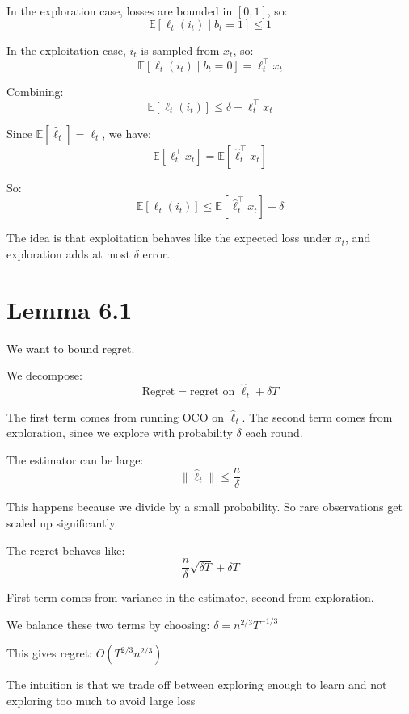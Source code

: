 \documentclass{article}
\begin{document}
In the exploration case, losses are bounded in $[0,1]$, so:
\[
\mathbb{E}[\ell_t(i_t)\mid b_t=1] \le 1
\]

In the exploitation case, $i_t$ is sampled from $x_t$, so:
\[
\mathbb{E}[\ell_t(i_t)\mid b_t=0] = \ell_t^\top x_t
\]

Combining:
\[
\mathbb{E}[\ell_t(i_t)] \le \delta + \ell_t^\top x_t
\]

Since $\mathbb{E}[\hat{\ell}_t] = \ell_t$, we have:
\[
\mathbb{E}[\ell_t^\top x_t] = \mathbb{E}[\hat{\ell}_t^\top x_t]
\]

So:
\[
\mathbb{E}[\ell_t(i_t)] \le \mathbb{E}[\hat{\ell}_t^\top x_t] + \delta
\]

The idea is that exploitation behaves like the expected loss under $x_t$, and exploration adds at most $\delta$ error.

\section{Lemma 6.1}

We want to bound regret.

We decompose:
\[
\text{Regret} = \text{regret on } \hat{\ell}_t + \delta T
\]

The first term comes from running OCO on $\hat{\ell}_t$. The second term comes from exploration, since we explore with probability $\delta$ each round.

The estimator can be large:
\[
\|\hat{\ell}_t\| \le \frac{n}{\delta}
\]

This happens because we divide by a small probability. So rare observations get scaled up significantly.

The regret behaves like:
\[
\frac{n}{\delta}\sqrt{\delta T} + \delta T
\]

First term comes from variance in the estimator, second from exploration.

We balance these two terms by choosing:
$\delta = n^{2/3} T^{-1/3}$

This gives regret:
$O(T^{2/3} n^{2/3})$

The intuition is that we trade off between exploring enough to learn and not exploring too much to avoid large loss

\pagebreak
\end{document}
